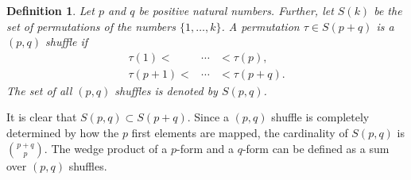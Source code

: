 \documentclass[12pt]{article}
\newtheorem*{defnn}{Definition}
\begin{document}
\begin{defnn}
Let $p$ and $q$ be positive natural numbers. Further,
let $S(k)$ be the set of permutations of the numbers $\{1,\ldots, k\}$.
A permutation $\tau\in S(p+q)$  is a $(p,q)$ \emph{shuffle}  if
\begin{eqnarray*}
\tau(1)< &\cdots& < \tau(p), \\
\tau(p+1)< &\cdots& < \tau(p+q).
\end{eqnarray*}
The set of all  $(p,q)$ shuffles is denoted by $S(p,q)$.
\end{defnn}

It is clear that $S(p,q)\subset S(p+q)$. Since a $(p,q)$ shuffle is
completely determined by how the $p$ first elements are mapped, the
cardinality of $S(p,q)$ is ${p+q \choose p}$.
The wedge product of a $p$-form and a $q$-form can be defined as a sum
over $(p,q)$ shuffles.
\end{document}
